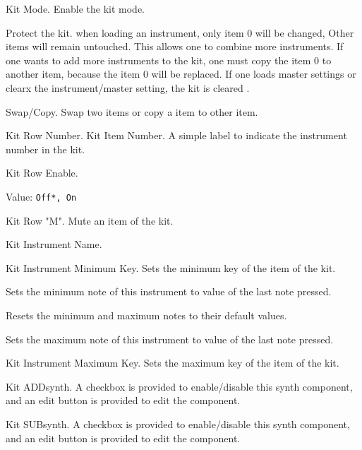    \begin{enumber}
      \item Kit Mode. Enable the kit mode.
      \item Protect the kit. when loading an instrument, only item 0 will be
      changed,
      Other items will remain untouched. This allows one to combine more
      instruments. If one wants to add more instruments to the kit, one must
      copy the item 0 to another item, because the item 0 will be replaced. If
      one loads master settings or clearx the instrument/master setting,
      the kit is cleared .
      \item Swap/Copy. Swap two items or copy a item to other item.
   \end{enumber}

   \setcounter{ItemCounter}{0}      %

   Kit Row Number.
   Kit Item Number.
   A simple label to indicate the instrument number in the kit.

   Kit Row Enable.

   Value: \texttt{Off*, On}

   Kit Row "M".
   Mute an item of the kit.

   Kit Instrument Name.

   Kit Instrument Minimum Key.
   Sets the minimum key of the item of the kit.

   Sets the minimum note of this instrument to value of the last note
   pressed.

   Resets the minimum and maximum notes to their default values.

   Sets the maximum note of this instrument to value of the last note
   pressed.

   Kit Instrument Maximum Key.
   Sets the maximum key of the item of the kit.

   Kit ADDsynth.
   A checkbox is provided to enable/disable this synth component, and
   an edit button is provided to edit the component.

   Kit SUBsynth.
   A checkbox is provided to enable/disable this synth component, and
   an edit button is provided to edit the component.

